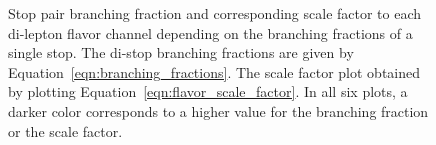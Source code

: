 \begin{figure}[ht]
  \centering
  \caption[
    Stop pair branching fraction and corresponding scale factor to each
    di-lepton flavor channel depending on the branching fractions of a single
    stop.
  ]{
    Stop pair branching fraction and corresponding scale factor to each
    di-lepton flavor channel depending on the branching fractions of a single
    stop.
    The di-stop branching fractions are given by
    Equation~\ref{eqn:branching_fractions}.
    The scale factor plot obtained by plotting
    Equation~\ref{eqn:flavor_scale_factor}.
    In all six plots, a darker color corresponds to a higher value for the
    branching fraction or the scale factor.
  }
  \label{fig:flavor_scaling}
\end{figure}

